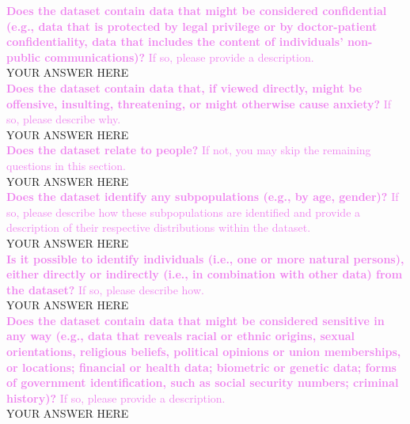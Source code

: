 \documentclass[letterpaper, 10 pt, conference]{ieeeconf}  %
\newcommand{\sectioncolor}{violet}
\begin{document}
    \textcolor{\sectioncolor}{\textbf{
    Does the dataset contain data that might be considered confidential (e.g.,
    data that is protected by legal privilege or by doctor-patient
    confidentiality, data that includes the content of individuals’ non-public
    communications)?
    }
    If so, please provide a description.
    } \\
    YOUR ANSWER HERE \\
    
    \textcolor{\sectioncolor}{\textbf{
    Does the dataset contain data that, if viewed directly, might be offensive,
    insulting, threatening, or might otherwise cause anxiety?
    }
    If so, please describe why.
    } \\
    YOUR ANSWER HERE \\
    
    \textcolor{\sectioncolor}{\textbf{
    Does the dataset relate to people?
    }
    If not, you may skip the remaining questions in this section.
    } \\
    YOUR ANSWER HERE \\
    
    \textcolor{\sectioncolor}{\textbf{
    Does the dataset identify any subpopulations (e.g., by age, gender)?
    }
    If so, please describe how these subpopulations are identified and
    provide a description of their respective distributions within the dataset.
    } \\
    YOUR ANSWER HERE \\
    
    \textcolor{\sectioncolor}{\textbf{
    Is it possible to identify individuals (i.e., one or more natural persons),
    either directly or indirectly (i.e., in combination with other data) from
    the dataset?
    }
    If so, please describe how.
    } \\
    YOUR ANSWER HERE \\
    
    \textcolor{\sectioncolor}{\textbf{
    Does the dataset contain data that might be considered sensitive in any way
    (e.g., data that reveals racial or ethnic origins, sexual orientations,
    religious beliefs, political opinions or union memberships, or locations;
    financial or health data; biometric or genetic data; forms of government
    identification, such as social security numbers; criminal history)?
    }
    If so, please provide a description.
    } \\
    YOUR ANSWER HERE \\
    
\end{document}
